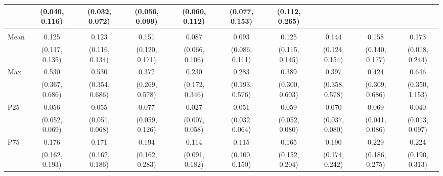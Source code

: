 {\begin{tabular}{l|c|c|c|c|c|c|c|c|c}
& {\scriptsize (0.040, 0.116)}
& {\scriptsize (0.032, 0.072)}
& {\scriptsize (0.056, 0.099)}
& {\scriptsize (0.060, 0.112)}
& {\scriptsize (0.077, 0.153)}
& {\scriptsize (0.112, 0.265)}
\\ [0.1cm]
\hline
\noalign{\smallskip}
\multicolumn{10}{l}{\textbf{Effect with Leads and Lags}} \\
\noalign{\smallskip}
\hline
Mean
& 0.125 & 0.123 & 0.151 & 0.087 & 0.093 & 0.125 & 0.144 & 0.158 & 0.173 \\
& {\scriptsize (0.117, 0.135)}
& {\scriptsize (0.116, 0.134)}
& {\scriptsize (0.120, 0.171)}
& {\scriptsize (0.066, 0.106)}
& {\scriptsize (0.086, 0.111)}
& {\scriptsize (0.115, 0.145)}
& {\scriptsize (0.124, 0.154)}
& {\scriptsize (0.140, 0.177)}
& {\scriptsize (0.018, 0.244)}
\\ [0.1cm]
\hline
Max
& 0.530 & 0.530 & 0.372 & 0.230 & 0.283 & 0.389 & 0.397 & 0.424 & 0.646 \\
& {\scriptsize (0.367, 0.686)}
& {\scriptsize (0.354, 0.686)}
& {\scriptsize (0.269, 0.578)}
& {\scriptsize (0.172, 0.346)}
& {\scriptsize (0.193, 0.576)}
& {\scriptsize (0.300, 0.603)}
& {\scriptsize (0.358, 0.578)}
& {\scriptsize (0.309, 0.686)}
& {\scriptsize (0.350, 1.153)}
\\ [0.1cm]
\hline
P25
& 0.056 & 0.055 & 0.077 & 0.027 & 0.051 & 0.059 & 0.070 & 0.069 & 0.040 \\
& {\scriptsize (0.052, 0.069)}
& {\scriptsize (0.051, 0.068)}
& {\scriptsize (0.059, 0.126)}
& {\scriptsize (0.007, 0.058)}
& {\scriptsize (0.032, 0.064)}
& {\scriptsize (0.052, 0.080)}
& {\scriptsize (0.037, 0.080)}
& {\scriptsize (0.041, 0.086)}
& {\scriptsize (0.013, 0.097)}
\\ [0.1cm]
\hline
P75
& 0.176 & 0.171 & 0.194 & 0.114 & 0.115 & 0.165 & 0.190 & 0.229 & 0.224 \\
& {\scriptsize (0.162, 0.193)}
& {\scriptsize (0.162, 0.186)}
& {\scriptsize (0.162, 0.283)}
& {\scriptsize (0.091, 0.182)}
& {\scriptsize (0.100, 0.150)}
& {\scriptsize (0.152, 0.204)}
& {\scriptsize (0.174, 0.242)}
& {\scriptsize (0.186, 0.275)}
& {\scriptsize (0.190, 0.313)}
\\ [0.1cm]
\hline
\hline
\end{tabular}
}
